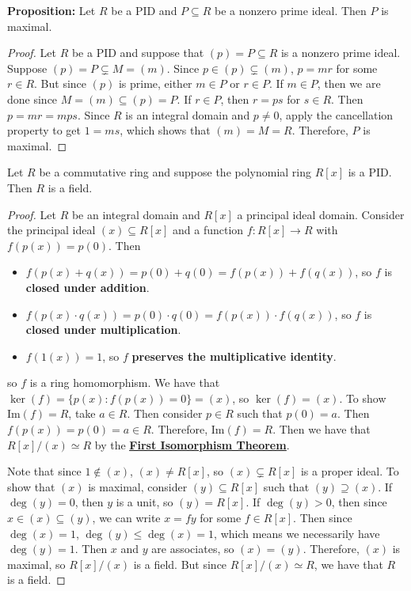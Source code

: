 \documentclass [12pt] {article}
\newenvironment{corollary}[1]{\begin{tcolorbox}[title={Corollary #1}]}{\end{tcolorbox}}
\renewcommand{\href}[2]{\hyperref[#1]{\bf{\underline{{#2}}}}}
\renewcommand{\bf}[1]{\textbf{{#1}}}
\renewcommand{\Im}{\text{Im}}
\begin{document}
\bf{Proposition:} Let $R$ be a PID and $P \subseteq R$ be a nonzero prime ideal. Then $P$ is
maximal.
\begin{proof}
    Let $R$ be a PID and suppose that $(p) = P \subseteq R$ is a nonzero prime ideal. Suppose
    $(p) = P \subsetneq M = (m)$. Since $p \in (p) \subsetneq (m)$, $p = mr$ for some $r \in R$.
    But since $(p)$ is prime, either $m \in P$ or $r \in P$. If $m \in P$, then we are done since
    $M = (m) \subseteq (p) = P$. If $r \in P$, then $r = ps$ for $s \in R$. Then
    $p = mr = mps$. Since $R$ is an integral domain and $p \neq 0$, apply the cancellation property
    to get $1 = ms$, which shows that $(m) = M = R$. Therefore, $P$ is maximal.
\end{proof}

\newpage
\begin{corollary}{}
    Let $R$ be a commutative ring and suppose the polynomial ring $R[x]$ is a PID. Then $R$ is a
    field.
\end{corollary}
\begin{proof}
    Let $R$ be an integral domain and $R[x]$ a principal ideal domain. Consider the principal ideal
    $(x) \subseteq R[x]$ and a function $f : R[x] \to R$ with $f(p(x)) = p(0)$. Then
    \begin{itemize}
        \item $f(p(x) + q(x)) = p(0) + q(0) = f(p(x)) + f(q(x))$, so $f$ is
            \bf{closed under addition}.
        \item $f(p(x) \cdot q(x)) = p(0) \cdot q(0) = f(p(x)) \cdot f(q(x))$, so $f$ is
            \bf{closed under multiplication}.
        \item $f(1(x)) = 1$, so $f$ \bf{preserves the multiplicative identity}.
    \end{itemize}
    so $f$ is a ring homomorphism. We have that $\ker(f) = \{ p(x) : f(p(x)) = 0 \} = (x)$, so
    $\ker(f) = (x)$. To show $\Im(f) = R$, take $a \in R$. Then consider
    $p \in R$ such that $p(0) = a$. Then $f(p(x)) = p(0) = a \in R$. Therefore,
    $\Im(f) = R$. Then we have that $R[x]/(x) \simeq R$ by the
    \href{thm:isothm}{First Isomorphism Theorem}.
    \vspace{0.5em}

    Note that since $1 \not \in (x)$, $(x) \neq R[x]$, so $(x) \subsetneq R[x]$ is a proper ideal.
    To show that $(x)$ is maximal, consider $(y) \subseteq R[x]$ such that $(y) \supseteq (x)$.
    If $\deg(y) = 0$, then $y$ is a unit, so $(y) = R[x]$. If $\deg(y) > 0$, then since
    $x \in (x) \subseteq (y)$, we can write $x = fy$ for some $f \in R[x]$. Then since
    $\deg(x) = 1$, $\deg(y) \leq \deg(x) = 1$, which means we necessarily have $\deg(y) = 1$. Then
    $x$ and $y$ are associates, so $(x) = (y)$. Therefore, $(x)$ is maximal, so $R[x]/(x)$ is a
    field. But since $R[x]/(x) \simeq R$, we have that $R$ is a field.
\end{proof}
\end{document}
